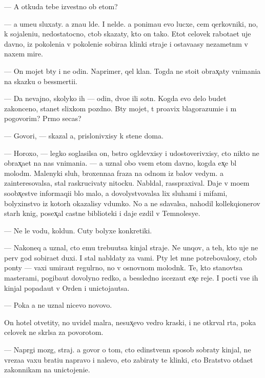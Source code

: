 \documentclass[10pt]{book}
\begin{document}
— A otkuda tebe izvestno ob etom?

— {\Y}a ume{\y}u sluxaty. {\Y}a zna{\y}u l{\iu}de{\y}. I nel{\iu}de{\y}. {\Y}a ponima{\y}u {\y}evo lucxe, cem qerkovniki, no, k sojaleni{\y}u, nedostatocno, ctob{\yi} skazaty, kto on tako{\y}. Etot celovek rabota{\y}et uje davno, iz pokoleni{\y}a v pokoleni{\y}e sobira{\y}a klinki straje{\y} i ostava{\y}asy nezametn{\yi}m v naxem mire.

— On mojet b{\yi}ty i ne odin. Naprimer, qel{\yi}{\y} klan. Togda ne sto{\y}it obrax̨aty vnimani{\y}a na skazku o bessmerti{\y}i.

— Da nevajno, skolyko ih — odin, dvo{\y}e ili sotn{\ia}. Kogda {\y}evo delo budet zakonceno, stanet slixkom pozdno. B{\yi}ty mojet, t{\yi} pro{\y}avix blagorazumi{\y}e i m{\yi} pogovorim? Pr{\ia}mo se{\y}cas?

— Govori, — skazal {\y}a, prislonivxisy k stene doma.

— Horoxo, — legko soglasilsa on, b{\yi}stro ogl{\ia}devxisy i udostoverivxisy, cto nikto ne obrax̨a{\y}et na nas vnimani{\y}a. — {\Y}a uznal obo vsem etom davno, kogda {\y}ex̨e b{\yi}l molod{\yi}m. Malenyki{\y} sluh, broxenna{\y}a fraza na odnom iz balov vedym. {\Y}a za{\y}interesovalsa, stal raskrucivaty nitocku. Nabl{\iu}dal, rasspraxival. Daje v mo{\y}em soobx̨estve informaqi{\y}i b{\yi}lo malo, {\y}a dovolystvovalsa lix sluhami i mifami, bolyxinstvo iz kotor{\yi}h okazalisy v{\yi}dumko{\y}. No {\y}a ne sdavalsa, nahodil kollekqionerov star{\yi}h knig, posex̨al castn{\yi}{\y}e biblioteki i daje {\y}ezdil v Temnolesye.

— Ne le{\y} vodu, koldun. Cuty bolyxe konkretiki.

— Nakoneq {\y}a uznal, cto {\y}emu trebu{\y}utsa kinjal{\yi} straje{\y}. Ne {\y}unqov, a teh, kto uje ne perv{\yi}{\y} god sobira{\y}et duxi. I stal nabl{\iu}daty za vami. P{\ia}ty let mne potrebovalosy, ctob{\yi} pon{\ia}ty — vaxi umira{\y}ut regul{\ia}rno, no v osnovnom molodn{\ia}k. Te, kto stanov{\ia}tsa masterami, pogiba{\y}ut dovolyno redko, a bessledno isceza{\y}ut {\y}ex̨e reje. I pocti vse ih kinjal{\yi} popada{\y}ut v Orden i unictoja{\y}utsa.

— Poka {\y}a ne uznal nicevo novovo.

On hotel otvetity, no uvidel mal{\ia}ra, nesux̨evo vedro kraski, i ne otkr{\yi}val rta, poka celovek ne skr{\yi}lsa za povorotom.

— Napr{\ia}gi mozg, straj. {\Y}a govor{\iu} o tom, cto {\y}edinstvenn{\yi}{\y} sposob sobraty kinjal{\yi}, ne v{\yi}reza{\y}a vaxu brati{\y}u napravo i nalevo, eto zabiraty te klinki, cto Bratstvo otda{\y}et zakonnikam na unictojeni{\y}e.
\end{document}
